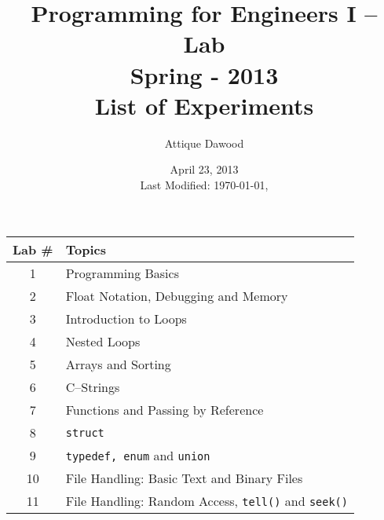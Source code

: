 \documentclass[12pt,a4paper]{article}
\title{\vspace{-2cm}Programming for Engineers I -- Lab\\Spring - 2013\\List of Experiments}
\author{Attique Dawood}
\date{April 23, 2013\\[0.2cm] Last Modified: \today, \currenttime}
\begin{document}
\maketitle
\begin{table}[H]
\begin{center}
\vspace{-0.3cm}
	\begin{tabular}{|c|p{10cm}|}
	\hline \hline
		\rule{0pt}{2.6ex} \textbf{Lab \#} & \textbf{Topics}\\
		\hline
		1 \rule{0pt}{2.6ex} & Programming Basics\\
		2 & Float Notation, Debugging and Memory\\
		3 & Introduction to Loops\\
		4 & Nested Loops\\
		5 & Arrays and Sorting\\
		6 & C--Strings\\
		7 & Functions and Passing by Reference\\
		8 & \texttt{struct}\\
		9 & \texttt{typedef, enum} and \texttt{union}\\
		10 & File Handling: Basic Text and Binary Files\\
		11 & File Handling: Random Access, \texttt{tell()} and \texttt{seek()}\\
	\hline \hline
	\end{tabular}
\end{center}
\label{Programming-I-List-Of-Experiments}
\end{table}
\end{document}
